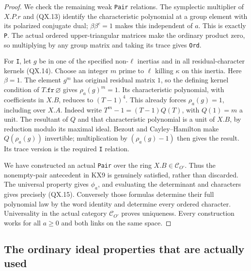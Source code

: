 \begin{proof}
We check the remaining weak \texttt{Pair} relations.
The symplectic multiplier of $X.P.r$ and (QX.13) identify
the characteristic polynomial at a group element with
its polarized conjugate dual; $\beta\beta^c=1$ makes this
independent of $a$.  This is exactly \texttt{P}.
The actual ordered upper-triangular matrices make the
ordinary product zero, so multiplying by any group matrix
and taking its trace gives \texttt{Ord}.

For \texttt{I}, let $g$ be in one of the specified non-$\ell$
inertias and in all residual-character kernels (QX.14).
Choose an integer $m$ prime to $\ell$ killing
$\kappa$ on this inertia.  Here $\beta=1$.  The element
$g^m$ has original residual matrix $1$, so the defining
kernel condition of $T.\texttt{fr}\,\varnothing$ gives
$\rho_a(g)^m=1$.  Its characteristic polynomial, with
coefficients in $X.B$, reduces to $(T-1)^4$.
This already forces $\rho_a(g)=1$, including over $X.A$.
Indeed write $T^m-1=(T-1)Q(T)$, with $Q(1)=m$ a unit.
The resultant of $Q$ and that characteristic polynomial is
a unit of $X.B$, by reduction modulo its maximal ideal.
Bezout and Cayley--Hamilton make $Q(\rho_a(g))$ invertible;
multiplication by $(\rho_a(g)-1)$ then gives the result.
Its trace version is the required \texttt{I} relation.

We have constructed an actual \texttt{Pair} over the ring
$X.B\in\mathcal C_{O'}$.  Thus the nonempty-pair antecedent
in KX9 is genuinely satisfied, rather than discarded.
The universal property gives $\phi_a$, and evaluating
the determinant and characters gives precisely (QX.15).
Conversely those formulas determine their full polynomial
law by the word identity and determine every ordered
character.  Universality in the actual category
$\mathcal C_{O'}$ proves uniqueness.  Every construction
works for all $a\ge0$ and both links on the same space.
\end{proof}

\subsection{The ordinary ideal properties that are actually used}

